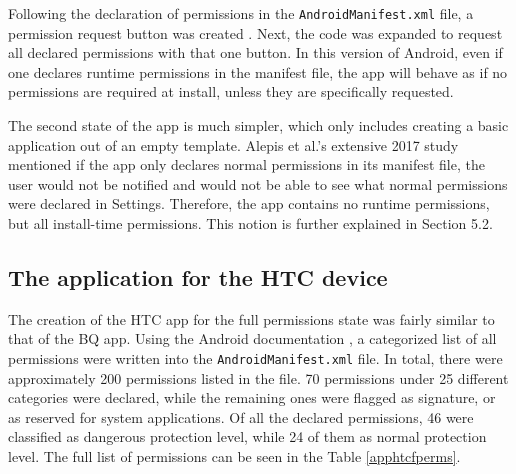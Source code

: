 \documentclass[
  a4paper,  %
  twoside,  %
  bibliography=totoc,
  headsepline,
  cleardoublepage=empty,
  parskip=half,
  draft=false,
  open=any
]{scrbook}
\begin{document}
Following the declaration of permissions in the \texttt{AndroidManifest.xml} file, a permission request button was created \cite{permButton}. Next, the code was expanded to request all declared permissions with that one button. In this version of Android, even if one declares runtime permissions in the manifest file, the app will behave as if no permissions are required at install, unless they are specifically requested.

The second state of the app is much simpler, which only includes creating a basic application out of an empty template. Alepis et al.'s extensive 2017 study mentioned if the app only declares normal permissions in its manifest file, the user would not be notified and would not be able to see what normal permissions were declared in Settings. Therefore, the app contains no runtime permissions, but all install-time permissions. This notion is further explained in Section 5.2.
\newpage
\subsection{The application for the HTC device}
The creation of the HTC app for the full permissions state was fairly similar to that of the BQ app. Using the Android documentation \cite{perms442}, a categorized list of all permissions were written into the \texttt{AndroidManifest.xml} file. In total, there were approximately 200 permissions listed in the file. 70 permissions under 25 different categories were declared, while the remaining ones were flagged as signature, or as reserved for system applications. Of all the declared permissions, 46 were classified as dangerous protection level, while 24 of them as normal protection level. The full list of permissions can be seen in the Table \ref{apphtcfperms}.
\end{document}

